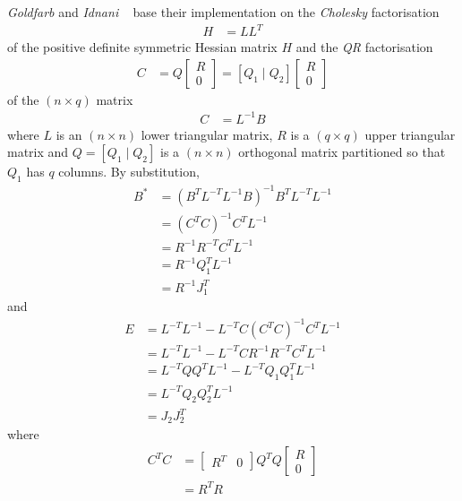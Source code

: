 \documentclass[a4paper,twoside,10pt,english]{report}
\begin{document}
\emph{Goldfarb} and \emph{Idnani}
~\cite[Section 4]{GoldfarbIdnani_NumericallyStableDualQuadraticPrograms}
base their implementation on the \emph{Cholesky} factorisation
\begin{align*}
H &= LL^{T}
\end{align*}
 of the positive definite symmetric Hessian matrix $H$ and the \emph{QR}
factorisation 
\begin{align*}
C &= Q\left[\begin{array}{c}
R\\
0
\end{array}\right]=\left[Q_{1}\mid Q_{2}\right]\left[\begin{array}{c}
R\\
0
\end{array}\right]
\end{align*}
of the $\left(n\times q\right)$ matrix 
\begin{align*}
C &= L^{-1}B
\end{align*}
where $L$ is an $\left(n\times n\right)$ lower triangular matrix,
$R$ is a $\left(q\times q\right)$ upper triangular matrix and $Q=\left[Q_{1}\mid Q_{2}\right]$
is a $\left(n\times n\right)$ orthogonal matrix partitioned so that
$Q_{1}$ has $q$ columns. By substitution, 
\begin{align*}
B^{*} &= \left(B^{T}L^{-T}L^{-1}B\right)^{-1}B^{T}L^{-T}L^{-1}\\
 &= \left(C^{T}C\right)^{-1}C^{T}L^{-1}\\
 &= R^{-1}R^{-T}C^{T}L^{-1}\\
 &= R^{-1}Q_{1}^{T}L^{-1}\\
 &= R^{-1}J_{1}^{T}
\end{align*}
and
\begin{align*}
E &= L^{-T}L^{-1}-L^{-T}C\left(C^{T}C\right)^{-1}C^{T}L^{-1}\\
 &= L^{-T}L^{-1}-L^{-T}CR^{-1}R^{-T}C^{T}L^{-1}\\
 &= L^{-T}QQ^{T}L^{-1}-L^{-T}Q_{1}Q_{1}^{T}L^{-1}\\
 &= L^{-T}Q_{2}Q_{2}^{T}L^{-1}\\
 &= J_{2}J_{2}^{T}
\end{align*}
where
\begin{align*}
C^{T}C &= \left[\begin{array}{cc}
R^{T} & 0\end{array}\right]Q^{T}Q\left[\begin{array}{c}
R\\
0
\end{array}\right]\\
 &= R^{T}R
\end{align*}
\end{document}
